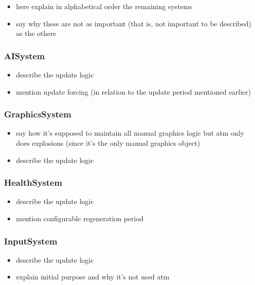 \begin{itemize}
    \item here explain in alphabetical order the remaining systems
    \item say why these are not as important (that is, not important to be described) as the others
\end{itemize}

\subsubsection{AISystem}

\begin{itemize}
    \item describe the update logic
    \item mention update forcing (in relation to the update period mentioned earlier)
\end{itemize}

\subsubsection{GraphicsSystem}

\begin{itemize}
    \item say how it's supposed to maintain all manual graphics logic but atm only does explosions
        (since it's the only manual graphics object)
    \item describe the update logic
\end{itemize}

\subsubsection{HealthSystem}

\begin{itemize}
    \item describe the update logic
    \item mention configurable regeneration period
\end{itemize}

\subsubsection{InputSystem}

\begin{itemize}
    \item describe the update logic
    \item explain initial purpose and why it's not used atm
\end{itemize}

